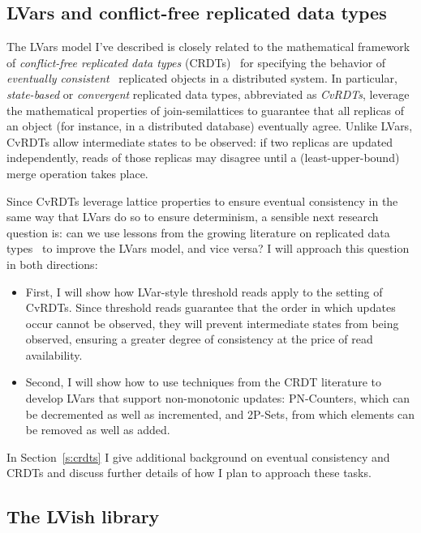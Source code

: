 \documentclass{article}
\begin{document}
\subsection{LVars and conflict-free replicated data types}

The LVars model I've described is closely related to the mathematical
framework of \emph{conflict-free replicated data types}
(CRDTs)~\cite{crdts} for specifying the behavior of \emph{eventually
  consistent}~\cite{vogels-ec} replicated objects in a distributed
system.  In particular, \emph{state-based} or \emph{convergent}
replicated data types, abbreviated as \emph{CvRDTs}, leverage the
mathematical properties of join-semilattices to guarantee that all
replicas of an object (for instance, in a distributed database)
eventually agree.  Unlike LVars, CvRDTs allow intermediate states to
be observed: if two replicas are updated independently, reads of those
replicas may disagree until a (least-upper-bound) merge operation
takes place.

Since CvRDTs leverage lattice properties to ensure eventual
consistency in the same way that LVars do so to ensure determinism, a
sensible next research question is: can we use lessons from the
growing literature on replicated data types~\cite{crdts, crdts-tr,
  rdts-popl14} to improve the LVars model, and vice versa?  I will
approach this question in both directions:
\begin{itemize}
\item First, I will show how LVar-style threshold reads apply to the
  setting of CvRDTs.  Since threshold reads guarantee that the order
  in which updates occur cannot be observed, they will prevent
  intermediate states from being observed, ensuring a greater degree
  of consistency at the price of read availability.
\item Second, I will show how to use techniques from the CRDT
  literature to develop LVars that support non-monotonic updates:
  PN-Counters, which can be decremented as well as incremented, and
  2P-Sets, from which elements can be removed as well as added.
\end{itemize}
In Section~\ref{s:crdts} I give additional background on eventual
consistency and CRDTs and discuss further details of how I plan to
approach these tasks.

\subsection{The LVish library}\label{ss:lvish}
\end{document}
